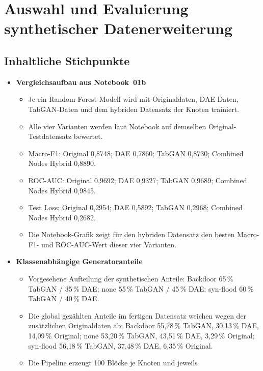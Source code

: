 \section{Auswahl und Evaluierung synthetischer Datenerweiterung}
\label{sec:synthetic-data}

\subsection{Inhaltliche Stichpunkte}
\begin{itemize}
  \item \textbf{Vergleichsaufbau aus Notebook~01b}
  \begin{itemize}
    \item Je ein Random-Forest-Modell wird mit Originaldaten, DAE-Daten,
          TabGAN-Daten und dem hybriden Datensatz der Knoten trainiert.
    \item Alle vier Varianten werden laut Notebook auf demselben
          Original-Testdatensatz bewertet.
    \item Macro-F1: Original 0{,}8748; DAE 0{,}7860; TabGAN 0{,}8730;
          Combined Nodes Hybrid 0{,}8890.
    \item ROC-AUC: Original 0{,}9692; DAE 0{,}9327; TabGAN 0{,}9689;
          Combined Nodes Hybrid 0{,}9845.
    \item Test Loss: Original 0{,}2954; DAE 0{,}5892; TabGAN 0{,}2968;
          Combined Nodes Hybrid 0{,}2682.
    \item Die Notebook-Grafik zeigt für den hybriden Datensatz den besten
          Macro-F1- und ROC-AUC-Wert dieser vier Varianten.
  \end{itemize}
  \item \textbf{Klassenabhängige Generatoranteile}
  \begin{itemize}
    \item Vorgesehene Aufteilung der synthetischen Anteile:
          Backdoor 65\,\% TabGAN / 35\,\% DAE;
          none 55\,\% TabGAN / 45\,\% DAE;
          syn-flood 60\,\% TabGAN / 40\,\% DAE.
    \item Die global gezählten Anteile im fertigen Datensatz weichen wegen
          der zusätzlichen Originaldaten ab:
          Backdoor 55{,}78\,\% TabGAN, 30{,}13\,\% DAE,
          14{,}09\,\% Original;
          none 53{,}20\,\% TabGAN, 43{,}51\,\% DAE,
          3{,}29\,\% Original;
          syn-flood 56{,}18\,\% TabGAN, 37{,}48\,\% DAE,
          6{,}35\,\% Original.
    \item Die Pipeline erzeugt 100 Blöcke je Knoten und jeweils

\end{itemize}
\end{itemize}
